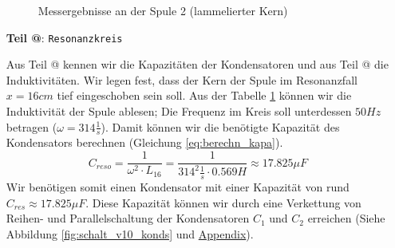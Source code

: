 \documentclass[10pt,a4paper]{article}
\makeatletter
\newcommand*{\rom}[1]{\expandafter\@slowromancap\romannumeral #1@}
\makeatother
\begin{document}
\begin{flushleft}
\begin{itemize}
\begin{figure}[H]
\caption{Messergebnisse an der Spule 2 (lammelierter Kern)}
\label{fig:messerg_spule2}
\end{figure}

\item[\textbf{Teil \rom{3}}:] \hypertarget{sec:erg_resk}{\texttt{Resonanzkreis}}

Aus Teil \rom{1} kennen wir die Kapazitäten der Kondensatoren und aus Teil \rom{2} die Induktivitäten. Wir legen fest, dass der Kern der Spule im Resonanzfall $x = 16cm$ tief eingeschoben sein soll. Aus der Tabelle \ref{fig:messerg_spule2} können wir die Induktivität der Spule ablesen; Die Frequenz im Kreis soll unterdessen $50 Hz$ betragen ($\omega = 314 \frac{1}{s}$). Damit können wir die benötigte Kapazität des Kondensators berechnen (Gleichung \ref{eq:berechn_kapa}).
\begin{equation*}
C_{reso} = \frac{1}{\omega^2 \cdot L_{16}} = \frac{1}{314^2 \frac{1}{s} \cdot 0.569 H} \approx 17.825 \mu F
\end{equation*}
Wir benötigen somit einen Kondensator mit einer Kapazität von rund $C_{res} \approx 17.825 \mu F$. Diese Kapazität können wir durch eine Verkettung von Reihen- und Parallelschaltung der Kondensatoren $C_1$ und $C_2$ erreichen (Siehe Abbildung \ref{fig:schalt_v10_konds} und \hyperlink{sec:appendix}{Appendix}).


\end{itemize}
\end{flushleft}
\end{document}
